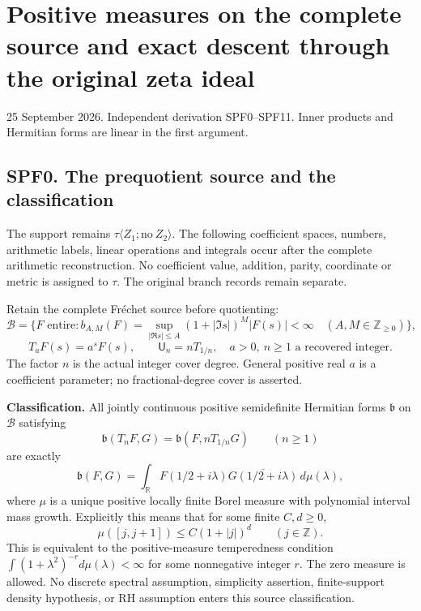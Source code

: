 \section{Positive measures on the complete source and exact descent
through the original zeta
ideal}\label{positive-measures-on-the-complete-source-and-exact-descent-through-the-original-zeta-ideal}

25 September 2026. Independent derivation SPF0--SPF11. Inner products
and Hermitian forms are linear in the first argument.

\subsection{SPF0. The prequotient source and the
classification}\label{spf0.-the-prequotient-source-and-the-classification}

The support remains \(\tau\langle Z_1;\mathrm{no}\ Z_2\rangle\). The
following coefficient spaces, numbers, arithmetic labels, linear
operations and integrals occur after the complete arithmetic
reconstruction. No coefficient value, addition, parity, coordinate or
metric is assigned to \(\tau\). The original branch records remain
separate.

Retain the complete Fréchet source before quotienting: \[
\mathcal B=\{F\text{ entire}:b_{A,M}(F)=
\sup_{|\Re s|\le A}(1+|\Im s|)^M|F(s)|<\infty
\quad(A,M\in\mathbb Z_{\ge0})\},
\] \[
T_aF(s)=a^sF(s),\qquad \mathsf U_n=nT_{1/n},
\quad a>0,\ n\ge1\text{ a recovered integer}.
\tag{SPF0.1}
\] The factor \(n\) is the actual integer cover degree. General positive
real \(a\) is a coefficient parameter; no fractional-degree cover is
asserted.

\textbf{Classification.} All jointly continuous positive semidefinite
Hermitian forms \(\mathfrak b\) on \(\mathcal B\) satisfying \[
\mathfrak b(T_nF,G)=\mathfrak b(F,nT_{1/n}G)
\qquad(n\ge1)
\tag{SPF0.2}
\] are exactly \[
\boxed{\mathfrak b(F,G)=\int_{\mathbb R}
F(1/2+i\lambda)\overline{G(1/2+i\lambda)}\,d\mu(\lambda),}
\tag{SPF0.3}
\] where \(\mu\) is a unique positive locally finite Borel measure with
polynomial interval mass growth. Explicitly this means that for some
finite \(C,d\ge0\), \[
\mu([j,j+1])\le C(1+|j|)^d\qquad(j\in\mathbb Z).
\tag{SPF0.4}
\] This is equivalent to the positive-measure temperedness condition
\(\int(1+\lambda^2)^{-r}d\mu(\lambda)<\infty\) for some nonnegative
integer \(r\). The zero measure is allowed. No discrete spectral
assumption, simplicity assertion, finite-support density hypothesis, or
RH assumption enters this source classification.

